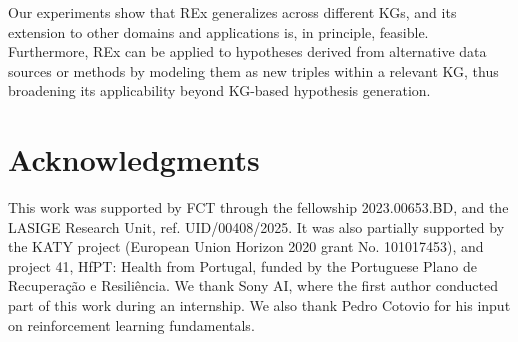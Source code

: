 \documentclass{article}
\theoremstyle{definition}
\begin{document}
Our experiments show that REx generalizes across different KGs, and its extension to other domains and applications is, in principle, feasible. Furthermore, REx can be applied to hypotheses derived from alternative data sources or methods by modeling them as new triples within a relevant KG, thus broadening its applicability beyond KG-based hypothesis generation.



\section*{Acknowledgments}
This work was supported by FCT through the fellowship
2023.00653.BD, and the LASIGE Research Unit, ref. UID/00408/2025. It was also partially supported by the KATY project (European Union Horizon 2020 grant No. 101017453), and project 41, HfPT: Health from Portugal, funded by the Portuguese Plano de Recuperação e Resiliência. We thank Sony AI, where the first author conducted part of this work during an internship. We also thank Pedro Cotovio for his input on reinforcement learning fundamentals. 

\appendix



\end{document}

